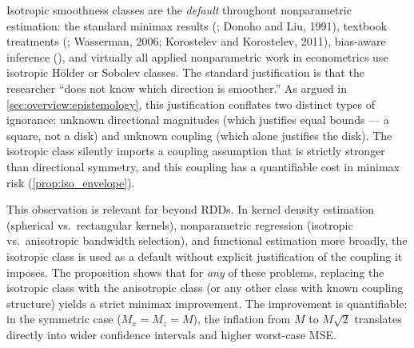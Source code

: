 \begin{itemize}
	Isotropic smoothness classes are the \emph{default} throughout nonparametric estimation: the standard minimax results (\textcite{stone_optimal_1980}; Donoho and Liu, 1991), textbook treatments (\textcite{tsybakov_introduction_2009}; Wasserman, 2006; Korostelev and Korostelev, 2011), bias-aware inference (\textcite{armstrong_simple_2020}), and virtually all applied nonparametric work in econometrics use isotropic Hölder or Sobolev classes.
	The standard justification is that the researcher ``does not know which direction is smoother.''
	As argued in \cref{sec:overview:epistemology}, this justification conflates two distinct types of ignorance: unknown directional magnitudes (which justifies equal bounds --- a square, not a disk) and unknown coupling (which alone justifies the disk).
	The isotropic class silently imports a coupling assumption that is strictly stronger than directional symmetry, and this coupling has a quantifiable cost in minimax risk (\cref{prop:iso_envelope}).

	This observation is relevant far beyond RDDs.
	In kernel density estimation (spherical vs.\ rectangular kernels), nonparametric regression (isotropic vs.\ anisotropic bandwidth selection), and functional estimation more broadly, the isotropic class is used as a default without explicit justification of the coupling it imposes.
	The proposition shows that for \emph{any} of these problems, replacing the isotropic class with the anisotropic class (or any other class with known coupling structure) yields a strict minimax improvement.
	The improvement is quantifiable: in the symmetric case ($M_x = M_z = M$), the inflation from $M$ to $M\sqrt{2}$ translates directly into wider confidence intervals and higher worst-case MSE.


\end{itemize}
